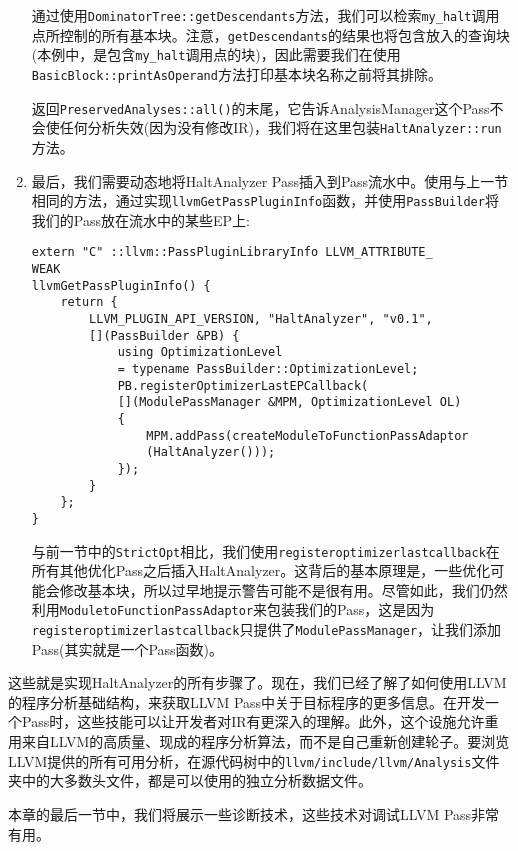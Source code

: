 \begin{enumerate}
通过使用\texttt{DominatorTree::getDescendants}方法，我们可以检索\texttt{my\_halt}调用点所控制的所有基本块。注意，\texttt{getDescendants}的结果也将包含放入的查询块(本例中，是包含\texttt{my\_halt}调用点的块)，因此需要我们在使用\texttt{BasicBlock::printAsOperand}方法打印基本块名称之前将其排除。

返回\texttt{PreservedAnalyses::all()}的末尾，它告诉AnalysisManager这个Pass不会使任何分析失效(因为没有修改IR)，我们将在这里包装\texttt{HaltAnalyzer::run}方法。

\item 最后，我们需要动态地将HaltAnalyzer Pass插入到Pass流水中。使用与上一节相同的方法，通过实现\texttt{llvmGetPassPluginInfo}函数，并使用\texttt{PassBuilder}将我们的Pass放在流水中的某些EP上:

\begin{lstlisting}[style=styleCXX]
extern "C" ::llvm::PassPluginLibraryInfo LLVM_ATTRIBUTE_
WEAK
llvmGetPassPluginInfo() {
	return {
		LLVM_PLUGIN_API_VERSION, "HaltAnalyzer", "v0.1",
		[](PassBuilder &PB) {
			using OptimizationLevel
			= typename PassBuilder::OptimizationLevel;
			PB.registerOptimizerLastEPCallback(
			[](ModulePassManager &MPM, OptimizationLevel OL)
			{
				MPM.addPass(createModuleToFunctionPassAdaptor
				(HaltAnalyzer()));
			});
		}
	};
}
\end{lstlisting}

与前一节中的\texttt{StrictOpt}相比，我们使用\texttt{registeroptimizerlastcallback}在所有其他优化Pass之后插入HaltAnalyzer。这背后的基本原理是，一些优化可能会修改基本块，所以过早地提示警告可能不是很有用。尽管如此，我们仍然利用\texttt{ModuletoFunctionPassAdaptor}来包装我们的Pass，这是因为\texttt{registeroptimizerlastcallback}只提供了\texttt{ModulePassManager}，让我们添加Pass(其实就是一个Pass函数)。

\end{enumerate}

这些就是实现HaltAnalyzer的所有步骤了。现在，我们已经了解了如何使用LLVM的程序分析基础结构，来获取LLVM Pass中关于目标程序的更多信息。在开发一个Pass时，这些技能可以让开发者对IR有更深入的理解。此外，这个设施允许重用来自LLVM的高质量、现成的程序分析算法，而不是自己重新创建轮子。要浏览LLVM提供的所有可用分析，在源代码树中的\texttt{llvm/include/llvm/Analysis}文件夹中的大多数头文件，都是可以使用的独立分析数据文件。

本章的最后一节中，我们将展示一些诊断技术，这些技术对调试LLVM Pass非常有用。























